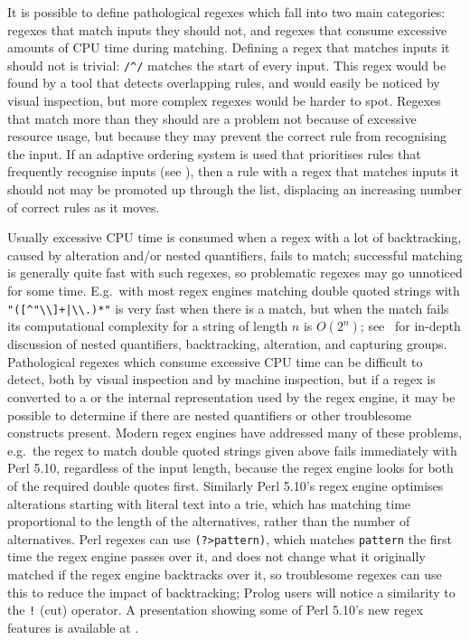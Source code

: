 It is possible to define pathological regexes which fall into two main
categories: regexes that match inputs they should not, and regexes that
consume excessive amounts of CPU time during matching.  Defining a regex
that matches inputs it should not is trivial: \verb!/^/! matches the start
of every input.  This regex would be found by a tool that detects
overlapping rules, and would easily be noticed by visual inspection, but
more complex regexes would be harder to spot.  Regexes that match more than
they should are a problem not because of excessive resource usage, but
because they may prevent the correct rule from recognising the input.  If
an adaptive ordering system is used that prioritises rules that frequently
recognise inputs (see ), then a
rule with a regex that matches inputs it should not may be promoted up
through the list, displacing an increasing number of correct rules as it
moves.

Usually excessive CPU time is consumed when a regex with a lot of
backtracking, caused by alteration and/or nested quantifiers, fails to
match; successful matching is generally quite fast with such regexes, so
problematic regexes may go unnoticed for some time.  E.g.\ with most regex
engines matching double quoted strings with \verb!"([^"\\]+|\\.)*"! is very
fast when there is a match, but when the match fails its computational
complexity for a string of length $n$ is $O(2^{n})$;
see~\cite{mastering-regular-expressions} for in-depth discussion of nested
quantifiers, backtracking, alteration, and capturing groups.  Pathological
regexes which consume excessive CPU time can be difficult to detect, both
by visual inspection and by machine inspection, but if a regex is converted
to a  or the internal representation used by the regex engine,
it may be possible to determine if there are nested quantifiers or other
troublesome constructs present.  Modern regex engines have addressed many
of these problems, e.g.\ the regex to match double quoted strings given
above fails immediately with Perl 5.10, regardless of the input length,
because the regex engine looks for both of the required double quotes
first.  Similarly Perl 5.10's regex engine optimises alterations starting
with literal text into a trie, which has matching time proportional to the
length of the alternatives, rather than the number of alternatives.  Perl
regexes can use \verb!(?>pattern)!, which matches \verb!pattern! the first
time the regex engine passes over it, and does not change what it
originally matched if the regex engine backtracks over it, so troublesome
regexes can use this to reduce the impact of backtracking; Prolog users
will notice a similarity to the \verb'!' (cut) operator.  A presentation
showing some of Perl 5.10's new regex features is available at
.

